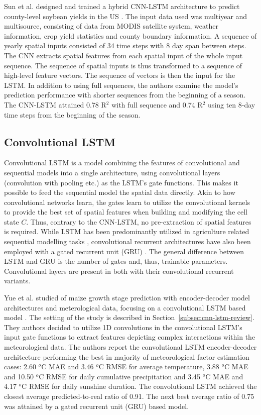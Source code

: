 Sun et al. designed and trained a hybrid CNN-LSTM architecture to predict county-level soybean yields in the US \cite{Sun2019}. The input data used was multiyear and multisource, consisting of data from MODIS satellite system, weather information, crop yield statistics and county boundary information. A sequence of yearly spatial inputs consisted of 34 time steps with 8 day span between steps. The CNN extracts spatial features from each spatial input of the whole input sequence. The sequence of spatial inputs is thus transformed to a sequence of high-level feature vectors. The sequence of vectors is then the input for the LSTM. In addition to using full sequences, the authors examine the model's prediction performance with shorter sequences from the beginning of a season. The CNN-LSTM attained 0.78 R$^2$ with full sequence and 0.74 R$^2$ using ten 8-day time steps from the beginning of the season.


\subsection{Convolutional LSTM}
\label{subsec:conv-lstm-review}

Convolutional LSTM \cite{Shi2015a} is a model combining the features of convolutional and sequential models into a single architecture, using convolutional layers (convolution with pooling etc.) as the LSTM's gate functions. This makes it possible to feed the sequential model the spatial data directly. Akin to how convolutional networks learn, the gates learn to utilize the convolutional kernels to provide the best set of spatial features when building and modifying the cell state $C$. Thus, contrary to the CNN-LSTM, no pre-extraction of spatial features is required. While LSTM has been predominantly utilized in agriculture related sequential modelling tasks \cite{VanKlompenburg2020,Kamilaris2018a}, convolutional recurrent architectures have also been employed with a gated recurrent unit (GRU) \cite{Cho2014}. The general difference between LSTM and GRU is the number of gates and, thus, trainable parameters. Convolutional layers are present in both with their convolutional recurrent variants.

Yue et al. studied of maize growth stage prediction with encoder-decoder model architectures and meterological data, focusing on a convolutional LSTM based model \cite{Yue2020}. The setting of the study is described in Section~\ref{subsec:cnn-lstm-review}. They authors decided to utilize 1D convolutions in the convolutional LSTM's input gate functions to extract features depicting complex interactions within the meteorological data. The authors report the convolutional LSTM encoder-decoder architecture performing the best in majority of meteorological factor estimation cases: 2.60 $^o$C MAE and 3.46 $^o$C RMSE for average temperature, 3.88 $^o$C MAE and 10.50 $^o$C RMSE for daily cumulative precipitation and 3.45 $^o$C MAE and 4.17 $^o$C RMSE for daily sunshine duration. The convolutional LSTM achieved the closest average predicted-to-real ratio of 0.91. The next best average ratio of 0.75 was attained by a gated recurrent unit (GRU) based model.

